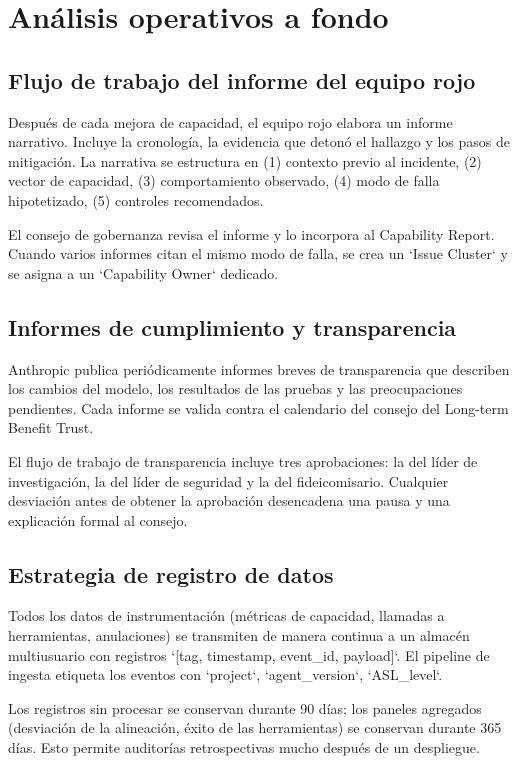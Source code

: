 \section{Análisis operativos a fondo}

\subsection{Flujo de trabajo del informe del equipo rojo}

Después de cada mejora de capacidad, el equipo rojo elabora un informe narrativo. Incluye la cronología, la evidencia que detonó el hallazgo y los pasos de mitigación. La narrativa se estructura en (1) contexto previo al incidente, (2) vector de capacidad, (3) comportamiento observado, (4) modo de falla hipotetizado, (5) controles recomendados.

El consejo de gobernanza revisa el informe y lo incorpora al Capability Report. Cuando varios informes citan el mismo modo de falla, se crea un `Issue Cluster` y se asigna a un `Capability Owner` dedicado.

\subsection{Informes de cumplimiento y transparencia}

Anthropic publica periódicamente informes breves de transparencia que describen los cambios del modelo, los resultados de las pruebas y las preocupaciones pendientes. Cada informe se valida contra el calendario del consejo del Long-term Benefit Trust.

El flujo de trabajo de transparencia incluye tres aprobaciones: la del líder de investigación, la del líder de seguridad y la del fideicomisario. Cualquier desviación antes de obtener la aprobación desencadena una pausa y una explicación formal al consejo.

\subsection{Estrategia de registro de datos}

Todos los datos de instrumentación (métricas de capacidad, llamadas a herramientas, anulaciones) se transmiten de manera continua a un almacén multiusuario con registros `[tag, timestamp, event\_id, payload]`. El pipeline de ingesta etiqueta los eventos con `project`, `agent\_version`, `ASL\_level`.

Los registros sin procesar se conservan durante 90 días; los paneles agregados (desviación de la alineación, éxito de las herramientas) se conservan durante 365 días. Esto permite auditorías retrospectivas mucho después de un despliegue.

